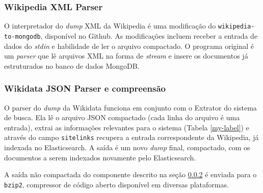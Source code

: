 \documentclass[12pt]{article}
\begin{document}
\subsubsection{Wikipedia XML Parser}

O interpretador do \emph{dump} XML da Wikipedia é uma modificação do \texttt{wikipedia-to-mongodb}, disponível no Github. As modificações incluem receber a entrada de dados do \emph{stdin} e habilidade de ler o arquivo compactado. O programa original é um \emph{parser} que lê arquivos XML na forma de \emph{stream} e insere os documentos já estruturados no banco de dados MongoDB.

\subsubsection{Wikidata JSON Parser e compreensão}
\label{section_json_parser}

O parser do \emph{dump} da Wikidata funciona em conjunto com o Extrator do sistema de busca. Ela lê o arquivo JSON compactado (cada linha do arquivo é uma entrada), extrai as informações relevantes para o sistema (Tabela \ref{my-label}) e através do campo \texttt{sitelinks} recupera a entrada correspondente da Wikipedia, já indexada no Elasticsearch. A saída é um novo \emph{dump} final, compactado, com os documentos a serem indexados novamente pelo Elasticsearch.

A saída não compactada do componente descrito na seção \ref{section_json_parser} é enviada para o \texttt{bzip2}, compressor de código aberto disponível em diversas plataformas.
\end{document}
